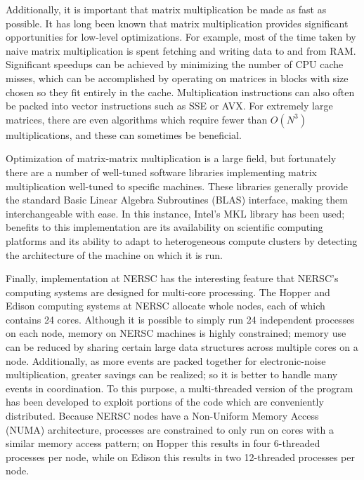 Additionally, it is important that matrix multiplication be made as fast as possible.  It has long been known that matrix multiplication provides significant opportunities for low-level optimizations. For example, most of the time taken by naive matrix multiplication is spent fetching and writing data to and from RAM.  Significant speedups can be achieved by minimizing the number of CPU cache misses, which can be accomplished by operating on matrices in blocks with size chosen so they fit entirely in the cache.  Multiplication instructions can also often be packed into vector instructions such as SSE or AVX.  For extremely large matrices, there are even algorithms which require fewer than $O(N^3)$ multiplications, and these can sometimes be beneficial.~\cite{AnatomyOfMatrixMultiply}

Optimization of matrix-matrix multiplication is a large field, but fortunately there are a number of well-tuned software libraries implementing matrix multiplication well-tuned to specific machines.  These libraries generally provide the standard Basic Linear Algebra Subroutines (BLAS) interface, making them interchangeable with ease.  In this instance, Intel's MKL library has been used; benefits to this implementation are its availability on scientific computing platforms and its ability to adapt to heterogeneous compute clusters by detecting the architecture of the machine on which it is run.~\cite{IntelMKL}

Finally, implementation at NERSC has the interesting feature that NERSC's computing systems are designed for multi-core processing.  The Hopper and Edison computing systems at NERSC allocate whole nodes, each of which contains 24 cores.  Although it is possible to simply run 24 independent processes on each node, memory on NERSC machines is highly constrained; memory use can be reduced by sharing certain large data structures across multiple cores on a node.  Additionally, as more events are packed together for electronic-noise multiplication, greater savings can be realized; so it is better to handle many events in coordination.  To this purpose, a multi-threaded version of the program has been developed to exploit portions of the code which are conveniently distributed.  Because NERSC nodes have a Non-Uniform Memory Access (NUMA) architecture, processes are constrained to only run on cores with a similar memory access pattern; on Hopper this results in four 6-threaded processes per node, while on Edison this results in two 12-threaded processes per node.


